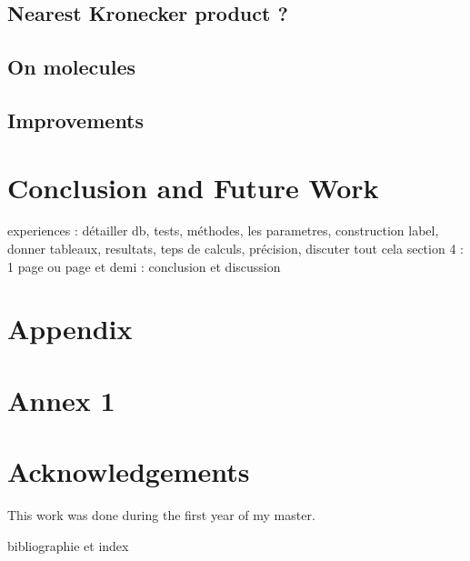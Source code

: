 \documentclass{article}
\theoremstyle{definition}
\begin{document}
\subsection{Nearest Kronecker product ?}

\subsection{On molecules}

\subsection{Improvements}

\section{Conclusion and Future Work}
experiences : détailler db, tests, méthodes, les parametres, construction label, donner tableaux, resultats, teps de calculs, précision, discuter tout cela
section 4 : 1 page ou page et demi : conclusion et discussion


\appendix
\section{Appendix}
\section{Annex 1}

\section{Acknowledgements}
This work was done during the first year of my master.

\listoffigures
\listoftables
bibliographie et index



\end{document}
